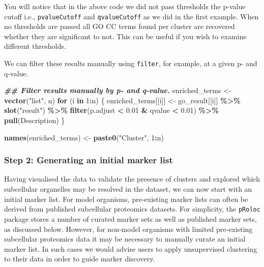 \documentclass[9pt,a4paper,]{extarticle}
\newenvironment{Shaded}{\begin{snugshade}}{\end{snugshade}}
\newcommand{\ControlFlowTok}[1]{\textcolor[rgb]{0.13,0.29,0.53}{\textbf{#1}}}
\newcommand{\DecValTok}[1]{\textcolor[rgb]{0.00,0.00,0.81}{#1}}
\newcommand{\DocumentationTok}[1]{\textcolor[rgb]{0.56,0.35,0.01}{\textbf{\textit{#1}}}}
\newcommand{\FloatTok}[1]{\textcolor[rgb]{0.00,0.00,0.81}{#1}}
\newcommand{\FunctionTok}[1]{\textcolor[rgb]{0.13,0.29,0.53}{\textbf{#1}}}
\newcommand{\NormalTok}[1]{#1}
\newcommand{\OtherTok}[1]{\textcolor[rgb]{0.56,0.35,0.01}{#1}}
\newcommand{\SpecialCharTok}[1]{\textcolor[rgb]{0.81,0.36,0.00}{\textbf{#1}}}
\newcommand{\StringTok}[1]{\textcolor[rgb]{0.31,0.60,0.02}{#1}}
\begin{document}
You will notice that in the above code we did not pass thresholds the p-value
cutoff i.e., \texttt{pvalueCutoff} and \texttt{qvalueCutoff} as we did in the first example.
When no thresholds are passed all GO CC terms found per cluster are recovered
whether they are significant to not. This can be useful if you wish to examine
different thresholds.

We can filter these results manually using \texttt{filter}, for example, at a given
p- and q-value.

\begin{Shaded}
\begin{Highlighting}[]
\DocumentationTok{\#\# Filter results manually by p{-} and q{-}value.}
\NormalTok{enriched\_terms }\OtherTok{\textless{}{-}} \FunctionTok{vector}\NormalTok{(}\StringTok{"list"}\NormalTok{, n)}
\ControlFlowTok{for}\NormalTok{ (i }\ControlFlowTok{in} \DecValTok{1}\SpecialCharTok{:}\NormalTok{n) \{}
\NormalTok{  enriched\_terms[[i]] }\OtherTok{\textless{}{-}}\NormalTok{ go\_result[[i]] }\SpecialCharTok{\%\textgreater{}\%}
    \FunctionTok{slot}\NormalTok{(}\StringTok{"result"}\NormalTok{) }\SpecialCharTok{\%\textgreater{}\%} 
    \FunctionTok{filter}\NormalTok{(p.adjust }\SpecialCharTok{\textless{}} \FloatTok{0.01} \SpecialCharTok{\&}\NormalTok{ qvalue }\SpecialCharTok{\textless{}} \FloatTok{0.01}\NormalTok{) }\SpecialCharTok{\%\textgreater{}\%} 
    \FunctionTok{pull}\NormalTok{(Description)}
\NormalTok{\}}

\FunctionTok{names}\NormalTok{(enriched\_terms) }\OtherTok{\textless{}{-}} \FunctionTok{paste0}\NormalTok{(}\StringTok{"Cluster"}\NormalTok{, }\DecValTok{1}\SpecialCharTok{:}\NormalTok{n)}
\end{Highlighting}
\end{Shaded}

\subsubsection{Step 2: Generating an initial marker list}\label{step-2-generating-an-initial-marker-list}

Having visualised the data to validate the presence of clusters and explored
which subcellular organelles may be resolved in the dataset, we can now start
with an initial marker list. For model organisms, pre-existing marker lists can
often be derived from published subcellular proteomics datasets. For simplicity,
the \texttt{pRoloc} package stores a number of curated marker sets as well as published
marker sets, as discussed below. However, for non-model organisms with limited
pre-existing subcellular proteomics data it may be necessary to manually curate
an initial marker list. In such cases we would advise users to apply unsupervised
clustering to their data in order to guide marker discovery.
\end{document}
